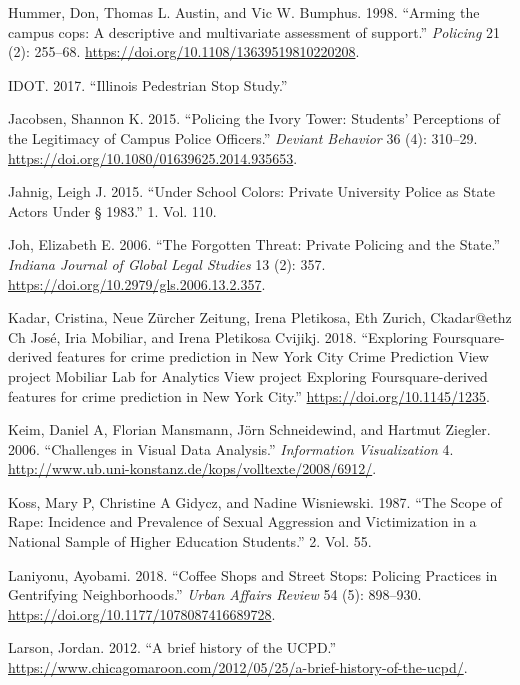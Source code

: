 \documentclass{ucetd}
\begin{document}
\leavevmode\hypertarget{ref-Hummer1998}{}%
Hummer, Don, Thomas L. Austin, and Vic W. Bumphus. 1998. ``Arming the
campus cops: A descriptive and multivariate assessment of support.''
\emph{Policing} 21 (2): 255--68.
\url{https://doi.org/10.1108/13639519810220208}.

\leavevmode\hypertarget{ref-IDOT2017}{}%
IDOT. 2017. ``Illinois Pedestrian Stop Study.''

\leavevmode\hypertarget{ref-Jacobsen2015}{}%
Jacobsen, Shannon K. 2015. ``Policing the Ivory Tower: Students'
Perceptions of the Legitimacy of Campus Police Officers.'' \emph{Deviant
Behavior} 36 (4): 310--29.
\url{https://doi.org/10.1080/01639625.2014.935653}.

\leavevmode\hypertarget{ref-Jahnig2015}{}%
Jahnig, Leigh J. 2015. ``Under School Colors: Private University Police
as State Actors Under § 1983.'' 1. Vol. 110.

\leavevmode\hypertarget{ref-Joh2006}{}%
Joh, Elizabeth E. 2006. ``The Forgotten Threat: Private Policing and the
State.'' \emph{Indiana Journal of Global Legal Studies} 13 (2): 357.
\url{https://doi.org/10.2979/gls.2006.13.2.357}.

\leavevmode\hypertarget{ref-Kadar2018}{}%
Kadar, Cristina, Neue Zürcher Zeitung, Irena Pletikosa, Eth Zurich,
Ckadar@ethz Ch José, Iria Mobiliar, and Irena Pletikosa Cvijikj. 2018.
``Exploring Foursquare-derived features for crime prediction in New York
City Crime Prediction View project Mobiliar Lab for Analytics View
project Exploring Foursquare-derived features for crime prediction in
New York City.'' \url{https://doi.org/10.1145/1235}.

\leavevmode\hypertarget{ref-Keim2006}{}%
Keim, Daniel A, Florian Mansmann, Jörn Schneidewind, and Hartmut
Ziegler. 2006. ``Challenges in Visual Data Analysis.'' \emph{Information
Visualization} 4.
\url{http://www.ub.uni-konstanz.de/kops/volltexte/2008/6912/}.

\leavevmode\hypertarget{ref-Koss1987}{}%
Koss, Mary P, Christine A Gidycz, and Nadine Wisniewski. 1987. ``The
Scope of Rape: Incidence and Prevalence of Sexual Aggression and
Victimization in a National Sample of Higher Education Students.'' 2.
Vol. 55.

\leavevmode\hypertarget{ref-Laniyonu2018}{}%
Laniyonu, Ayobami. 2018. ``Coffee Shops and Street Stops: Policing
Practices in Gentrifying Neighborhoods.'' \emph{Urban Affairs Review} 54
(5): 898--930. \url{https://doi.org/10.1177/1078087416689728}.

\leavevmode\hypertarget{ref-Larson2012}{}%
Larson, Jordan. 2012. ``A brief history of the UCPD.''
\url{https://www.chicagomaroon.com/2012/05/25/a-brief-history-of-the-ucpd/}.
\end{document}
